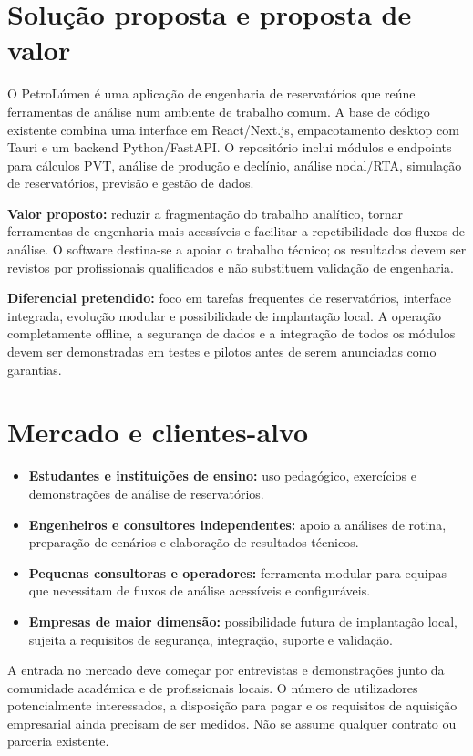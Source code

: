 \documentclass[11pt,a4paper]{article}
\begin{document}
\section{Solução proposta e proposta de valor}

O PetroLúmen é uma aplicação de engenharia de reservatórios que reúne ferramentas de
análise num ambiente de trabalho comum. A base de código existente combina uma
interface em React/Next.js, empacotamento desktop com Tauri e um backend Python/FastAPI.
O repositório inclui módulos e endpoints para cálculos PVT, análise de produção e
declínio, análise nodal/RTA, simulação de reservatórios, previsão e gestão de dados.

\textbf{Valor proposto:} reduzir a fragmentação do trabalho analítico, tornar
ferramentas de engenharia mais acessíveis e facilitar a repetibilidade dos fluxos
de análise. O software destina-se a apoiar o trabalho técnico; os resultados devem
ser revistos por profissionais qualificados e não substituem validação de engenharia.

\textbf{Diferencial pretendido:} foco em tarefas frequentes de reservatórios, interface
integrada, evolução modular e possibilidade de implantação local. A operação
completamente offline, a segurança de dados e a integração de todos os módulos devem
ser demonstradas em testes e pilotos antes de serem anunciadas como garantias.

\section{Mercado e clientes-alvo}

\begin{itemize}
  \item \textbf{Estudantes e instituições de ensino:} uso pedagógico, exercícios e
  demonstrações de análise de reservatórios.
  \item \textbf{Engenheiros e consultores independentes:} apoio a análises de rotina,
  preparação de cenários e elaboração de resultados técnicos.
  \item \textbf{Pequenas consultoras e operadores:} ferramenta modular para equipas
  que necessitam de fluxos de análise acessíveis e configuráveis.
  \item \textbf{Empresas de maior dimensão:} possibilidade futura de implantação
  local, sujeita a requisitos de segurança, integração, suporte e validação.
\end{itemize}

A entrada no mercado deve começar por entrevistas e demonstrações junto da comunidade
académica e de profissionais locais. O número de utilizadores potencialmente
interessados, a disposição para pagar e os requisitos de aquisição empresarial ainda
precisam de ser medidos. Não se assume qualquer contrato ou parceria existente.
\end{document}
